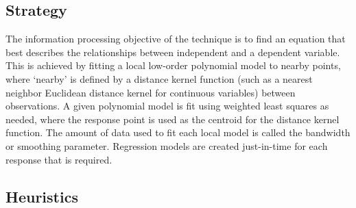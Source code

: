 \subsection{Strategy}
The information processing objective of the technique is to find an equation that best describes the relationships between independent and a dependent variable.
This is achieved by fitting a local low-order polynomial model to nearby points, where `nearby' is defined by a distance kernel function (such as a nearest neighbor Euclidean distance kernel for continuous variables) between observations. A given polynomial model is fit using weighted least squares as needed,  where the response point is used as the centroid for the distance kernel function. The amount of data used to fit each local model is called the bandwidth or smoothing parameter. Regression models are created just-in-time for each response that is required.

\subsection{Heuristics}


